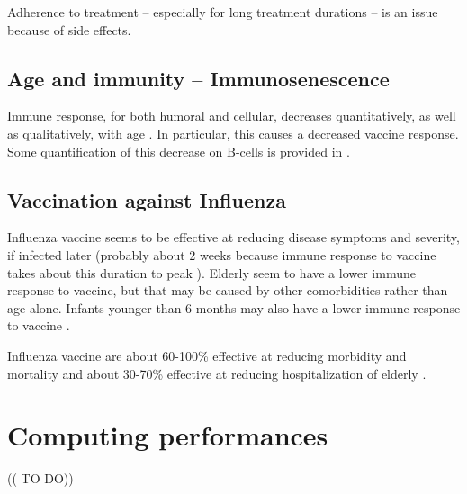 \documentclass[11pt, onecolumn]{article}
\begin{document}
Adherence to treatment -- especially for long treatment durations -- is an issue because of side effects.



\subsection{Age and immunity -- Immunosenescence}

Immune response, for both humoral and cellular, decreases quantitatively, as well as qualitatively, with age \cite{Vallejo:2011fe}. In particular, this causes a decreased vaccine response. Some quantification of this decrease on B-cells is provided in \cite{Frasca:2011bj,LeMaoult:1997wf}.


\subsection{Vaccination against Influenza }

Influenza vaccine seems to be effective at reducing disease symptoms and severity, if infected later (probably about 2 weeks because immune response to vaccine takes about this duration to peak \cite{Cox:2004vo}). 
Elderly seem to have a lower immune response to vaccine, but that may be caused by other comorbidities rather than age alone. Infants younger than 6 months may also have a lower immune response to vaccine \cite{Cox:2004vo}.

Influenza vaccine are about 60-100\% effective at reducing morbidity and mortality and about 30-70\% effective at reducing hospitalization of elderly  \cite{Cox:2004vo}.


\section{Computing performances}

(( TO DO))


\newpage



\end{document}
